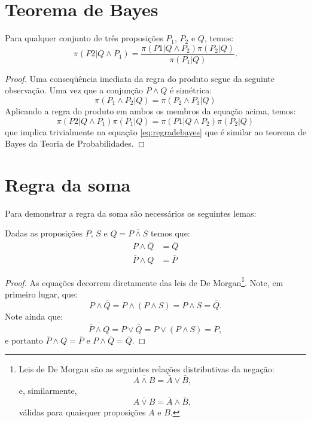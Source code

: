 \section{Teorema de Bayes}
\begin{Teorema}
Para qualquer conjunto de três proposições $P_1$, $P_2$ e $Q$, temos:
\begin{equation}
 \label{eq:regradebayes}
 \pi(P2 | Q \wedge P_1)  = \frac{\pi(P1 | Q \wedge P_2) \pi(P_2| Q)}{\pi(P_1| Q)}.
\end{equation}
\begin{proof}

Uma conseqüência imediata da regra do produto segue da seguinte observação. Uma vez que a conjunção $P\wedge Q$ é simétrica:
\[
 \pi(P_1\wedge P_2| Q) = \pi(P_2\wedge P_1 | Q) 
\]
Aplicando a regra do produto em ambos os membros da equação acima, temos:
\[
 \pi(P2 | Q \wedge P_1) \pi(P_1| Q) = \pi(P1 | Q \wedge P_2) \pi(P_2| Q)
\]
que implica trivialmente na equação \eqref{eq:regradebayes} que é similar ao teorema de Bayes da Teoria de Probabilidades.
\end{proof}
\end{Teorema}

\section{Regra da soma}

Para demonstrar a regra da soma são necessários os seguintes lemas:
\begin{Lema}
\label{lema:demorgan}
Dadas as proposições $P$, $S$ e $Q = \overline{P\wedge S}$ temos que:
\begin{align}
  P\wedge\bar{Q}  & = \bar{Q} \\
  \bar{P}\wedge Q &= \bar{P}
\end{align}

\begin{proof}
As equações decorrem diretamente das leis de De Morgan\footnote{Leis de De Morgan são as seguintes relações distributivas da negação: \[\overline{A\wedge B} =\bar{A}\vee\bar{B},\] e, similarmente, \[\overline{A\vee B} = \bar{A}\wedge\bar{B},\] válidas para quaisquer proposições $A$ e $B$.}. Note, em primeiro lugar, que: 
\[
  P\wedge\bar{Q} = P \wedge (P \wedge S) = P \wedge S = \bar{Q}.
\]
Note ainda que:
\[
 \overline{\bar{P}\wedge Q} = P \vee \bar{Q} = P \vee (P \wedge S) = P,
\]
e portanto $\bar{P}\wedge Q = \bar{P}$ e $P\wedge\bar{Q} = \bar{Q}$.
\end{proof}
\end{Lema}

